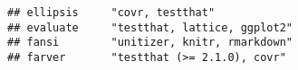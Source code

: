 \documentclass[]{book}
\begin{document}
\begin{verbatim}
## ellipsis     "covr, testthat"                                                                                                                                                                                                                                                                                                                                                                                                                                                                                                                                                                                                                                                                                          
## evaluate     "testthat, lattice, ggplot2"                                                                                                                                                                                                                                                                                                                                                                                                                                                                                                                                                                                                                                                                              
## fansi        "unitizer, knitr, rmarkdown"                                                                                                                                                                                                                                                                                                                                                                                                                                                                                                                                                                                                                                                                              
## farver       "testthat (>= 2.1.0), covr"                                                                                                                                                                                                                                                                                                                                                                                                                                                                                                                                                                                                                                                                               

\end{verbatim}
\end{document}
